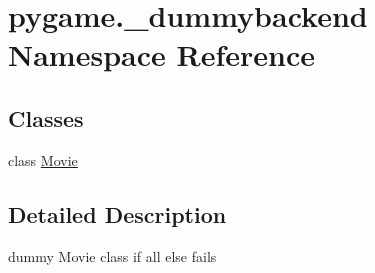 \hypertarget{namespacepygame_1_1__dummybackend}{}\section{pygame.\+\_\+dummybackend Namespace Reference}
\label{namespacepygame_1_1__dummybackend}
\subsection*{Classes}
\begin{DoxyCompactItemize}
\item 
class \hyperlink{classpygame_1_1__dummybackend_1_1_movie}{Movie}
\end{DoxyCompactItemize}


\subsection{Detailed Description}
\begin{DoxyVerb}dummy Movie class if all else fails \end{DoxyVerb}
 